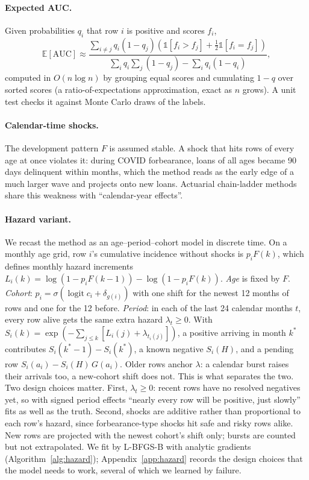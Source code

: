 \documentclass[11pt]{article}
\begin{document}
\paragraph{Expected AUC.} Given probabilities $q_i$ that row $i$ is positive and scores $f_i$,
\[ \mathbb{E}[\mathrm{AUC}] \approx \frac{\sum_{i \ne j} q_i (1 - q_j) \left( \mathbb{1}[f_i > f_j] + \tfrac12 \mathbb{1}[f_i = f_j] \right)}
{\sum_i q_i \sum_j (1 - q_j) - \sum_i q_i (1 - q_i)}, \]
computed in $O(n \log n)$ by grouping equal scores and cumulating $1 - q$ over sorted scores (a
ratio-of-expectations approximation, exact as $n$ grows). A unit test checks it against Monte
Carlo draws of the labels.

\paragraph{Calendar-time shocks.} The development pattern $F$ is assumed stable. A shock that
hits rows of every age at once violates it: during COVID forbearance, loans of all ages became
90 days delinquent within months, which the method reads as the early edge of a much larger
wave and projects onto new loans. Actuarial chain-ladder methods share this weakness with
``calendar-year effects''.

\paragraph{Hazard variant.} We recast the method as an age--period--cohort model in discrete
time. On a monthly age grid, row $i$'s cumulative incidence without shocks is $p_i F(k)$, which
defines monthly hazard increments $L_i(k) = \log(1 - p_i F(k-1)) - \log(1 - p_i F(k))$.
\emph{Age} is fixed by $F$. \emph{Cohort}: $p_i = \sigma(\operatorname{logit} c_i + \delta_{g(i)})$
with one shift for the newest 12 months of rows and one for the 12 before. \emph{Period}: in
each of the last 24 calendar months $t$, every row alive gets the same extra hazard
$\lambda_t \ge 0$. With $S_i(k) = \exp(-\sum_{j \le k} [L_i(j) + \lambda_{t_i(j)}])$, a positive
arriving in month $k^*$ contributes $S_i(k^*-1) - S_i(k^*)$, a known negative $S_i(H)$, and a
pending row $S_i(a_i) - S_i(H)\,G(a_i)$. Older rows anchor $\lambda$: a calendar burst raises
their arrivals too, a new-cohort shift does not. This is what separates the two. Two design
choices matter. First, $\lambda_t \ge 0$: recent rows have no resolved negatives yet, so with
signed period effects ``nearly every row will be positive, just slowly'' fits as well as the
truth. Second, shocks are additive rather than proportional to each row's hazard, since
forbearance-type shocks hit safe and risky rows alike. New rows are projected with the newest
cohort's shift only; bursts are counted but not extrapolated. We fit by L-BFGS-B with analytic
gradients (Algorithm~\ref{alg:hazard}); Appendix~\ref{app:hazard} records the design choices that
the model needs to work, several of which we learned by failure.
\end{document}
